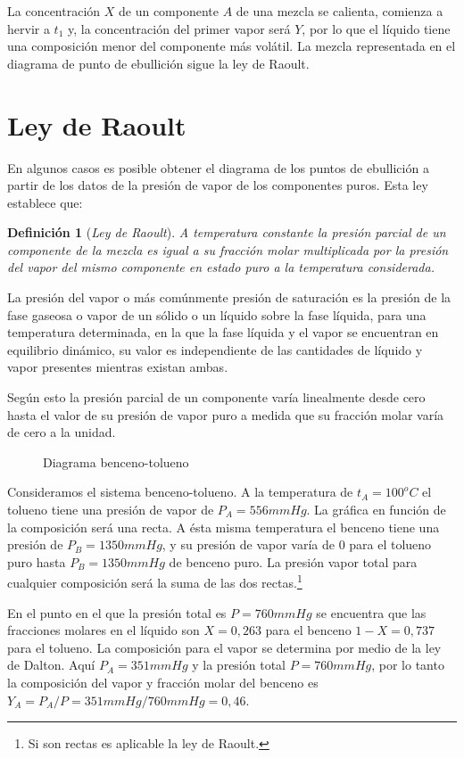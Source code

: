 \documentclass[11pt,openany]{book}
\newtheorem{defi}{Definición}
\begin{document}
La concentración $X$ de un componente $A$ de una mezcla se calienta, comienza a hervir a $t_1$ y, la 
concentración del primer vapor será $Y$, por lo que el líquido tiene una composición menor del componente más volátil.
La mezcla representada en el diagrama de punto de ebullición sigue la ley de Raoult.

\section{Ley de Raoult}

En algunos casos es posible obtener el diagrama de los puntos de ebullición a partir de los datos de
 la presión de vapor de los componentes puros. Esta ley establece que: 
\begin{defi}[\textit{Ley de Raoult}]
 A temperatura constante la presión parcial de un componente de la mezcla es igual a su fracción molar multiplicada por la 
 presión del vapor del mismo componente en estado puro a la temperatura considerada.
\end{defi}
 La presión del vapor o más comúnmente presión de saturación es la presión de la fase gaseosa o 
 vapor de un sólido o un líquido sobre la fase líquida, para una temperatura determinada, en la que 
 la fase líquida y el vapor se encuentran en equilibrio dinámico, su valor es independiente de las 
 cantidades de líquido y vapor presentes mientras existan ambas.

 Según esto la presión parcial de un componente varía linealmente desde cero hasta el valor de su 
 presión de vapor puro a medida que su fracción molar varía de cero a la unidad.

 \begin{figure}[h]
  \centering
  
  \caption{Diagrama benceno-tolueno}  
\end{figure}
  
 Consideramos el sistema benceno-tolueno. A la temperatura de $t_A=100^oC$ el tolueno tiene una presión 
 de vapor de $P_A=556 mmHg$. La gráfica en función de la composición será una recta. A ésta misma 
 temperatura el benceno tiene una presión de $P_B=1350 mmHg$, y su presión de vapor varía de 0 para el
  tolueno puro hasta $P_B=1350 mmHg$ de benceno puro. La presión vapor total para cualquier composición será 
  la suma de las dos rectas.\footnote {Si son rectas es aplicable la ley de Raoult.}

  En el punto en el que la presión total es $P=760 mmHg$ se encuentra que las fracciones molares en 
  el líquido son $X=0,263$ para el benceno $1-X=0,737$ para el tolueno. La composición para el vapor se 
  determina por medio de la ley de Dalton. Aquí $P_A=351 mmHg$ y la presión total $P=760 mmHg$, por lo tanto la 
  composición del vapor y fracción molar del benceno es $Y_A=P_A/P=351mmHg/760mmHg=0,46$.
  
\end{document}
